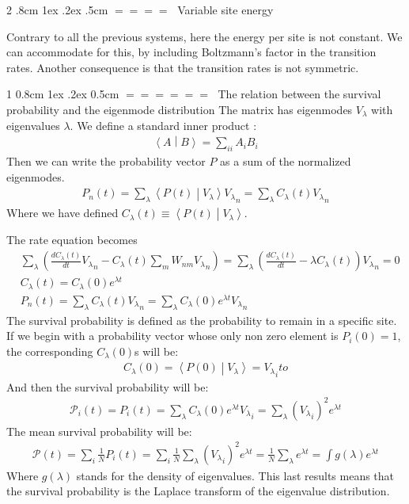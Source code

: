 \documentclass[onecolumn,fleqn,notitlepage,secnumarabic]{revtex4}
\makeatletter
\newcommand{\inner}[2]{\left \langle #1 \middle| #2\right\rangle} %
\def\section{%
  \@startsection
    {section}%
    {1}%
    {\z@}%
    {0.8cm \@plus1ex \@minus .2ex}%
    {0.5cm}%
    {\Large\bf $=\!=\!=\!=\!=\!=\;$}%
}%
\def\subsection{%
  \@startsection
    {subsection}%
    {2}%
    {\z@}%
    {.8cm \@plus1ex \@minus .2ex}%
    {.5cm}%
    {\normalfont\small\bfseries$=\!=\!=\!=\;$}%
}%
\makeatother
\begin{document}
\subsection{Variable site energy}

Contrary to all the previous systems, here the energy per site is not constant. We can \cite{Ambegaokar:1971} accommodate for this, by including Boltzmann's factor in the transition rates. Another consequence is that the transition rates is not symmetric.

\section{The relation between the survival probability and the eigenmode distribution}
The matrix has eigenmodes $V_\lambda$ with eigenvalues $\lambda$. 
We define a standard inner product :
\begin{align}
\inner{A}{B} = \sum_{ii} A_iB_i
\end{align}
Then we can write the probability vector $P$ as a sum of the normalized eigenmodes.
\begin{align}
P_n(t) = \sum_\lambda \inner{P(t)}{V_\lambda}{V_\lambda }_n = \sum_\lambda C_\lambda(t) {V_\lambda}_n
\end{align}
Where we have defined $C_\lambda(t)\equiv \inner{P(t)}{V_\lambda}$.

The rate equation becomes
\begin{align}
&\sum_\lambda \left( \frac{dC_\lambda(t)}{dt}{V_\lambda}_n - C_\lambda(t)\sum_m W_{nm}{V_\lambda}_n \right)= \sum_\lambda \left( \frac{dC_\lambda(t)}{dt} - \lambda C_\lambda(t)\right){V_\lambda}_n =0\\
&C_\lambda(t) = C_\lambda(0)e^{\lambda t}\\
&P_n(t) = \sum_\lambda C_\lambda(t) {V_\lambda}_n = \sum_\lambda  C_\lambda(0)e^{\lambda t} {V_\lambda}_n 
\end{align}
The survival probability is defined as the probability to remain in a specific site. If we begin with a probability vector whose only non zero element is $P_i(0)=1$, the corresponding $C_\lambda(0)$s will be:
\begin{align}
C_\lambda(0) = \inner{P(0)}{V_\lambda}= {V_\lambda}_ito
\end{align}
And then the survival probability will be:
\begin{align}
\mathcal{P}_i(t) = P_i(t) = \sum_\lambda  C_\lambda(0)e^{\lambda t} {V_\lambda}_i=\sum_\lambda ({V_\lambda}_i)^2 e^{\lambda t} 
\end{align}
The mean survival probability will be:
\begin{align} \label{eq:surv_eigenvalues}
\mathcal{P}(t) = \sum_i \frac{1}{N} P_i(t)=\sum_i \frac{1}{N} \sum_\lambda ({V_\lambda}_i)^2 e^{\lambda t}  =\frac{1}{N}\sum_\lambda e^{\lambda t} = \int g(\lambda) e^{\lambda t}
\end{align}
Where $g(\lambda)$ stands for the density of eigenvalues. This last results means that the survival probability is the Laplace transform of the eigenvalue distribution.
\end{document}
